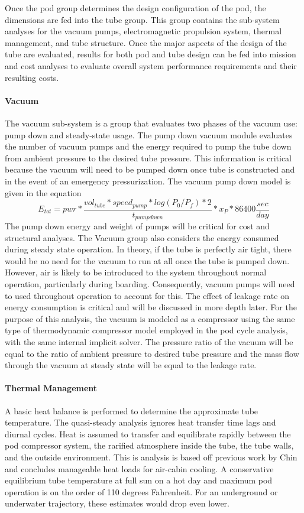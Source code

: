 	Once the pod group determines the design configuration of the pod, the
	dimensions are fed into the tube group. This group contains the sub-system
	analyses for the vacuum pumps, electromagnetic propulsion system, thermal
	management, and tube structure. Once the major aspects of the design of the
	tube are evaluated, results for both pod and tube design can be fed into
	mission and cost analyses to evaluate overall system performance
	requirements and their resulting costs.

\paragraph{Vacuum}
	The vacuum sub-system is a group that evaluates two phases of the vacuum
	use: pump down and steady-state usage. The pump down vacuum module
	evaluates the number of vacuum pumps and the energy required to pump the
	tube down from ambient pressure to the desired tube pressure.
	This information is critical because the vacuum will need to be pumped down
	once tube is constructed and in the event of an emergency pressurization.
	The vacuum pump down model is given in the equation
	\begin{equation}
		\label{eq:vacuum}
		E_{tot} = pwr * \frac{vol_{tube}*speed_{pump}*log(P_{0}/P_{f})*2}{t_{pumpdown}}* x_{P} * 86400 \frac{sec}{day}
	\end{equation}
	The pump down energy and weight of pumps will be critical for cost and structural analyses.
	The Vacuum group also considers the energy consumed during steady state operation.
	In theory, if the tube is perfectly air tight, there would be no need for
	the vacuum to run at all once the tube is pumped down. However, air is likely to be introduced
	to the system throughout normal operation, particularly during boarding. Consequently,
	vacuum pumps will need to used throughout operation to account for this.
	The effect of leakage rate on energy consumption is critical and will be
	discussed in more depth later. For the purpose of this analysis, the vacuum
	is modeled as a compressor using the same type of thermodynamic compressor
	model employed in the pod cycle analysis,
	with the same internal implicit solver.
	The pressure ratio of the vacuum will be equal to the ratio of ambient
	pressure to desired tube pressure and the mass flow through the vacuum at
	steady state will be equal to the leakage rate.
\paragraph{Thermal Management}
	A basic heat balance is performed to determine the approximate tube temperature.
	The quasi-steady analysis ignores heat transfer time lags and diurnal cycles.
	Heat is assumed to transfer and equilibrate rapidly between the pod compressor system,
	the rarified atmosphere inside the tube, the tube walls, and the outside environment.
	This is analysis is based off previous work by Chin\cite{Chin} and concludes
	manageable heat loads for air-cabin cooling. A conservative equilibrium
	tube temperature at full sun on a hot day and maximum pod operation is on
	the order of 110 degrees Fahrenheit.
	For an underground or underwater trajectory, these estimates would drop even lower.
